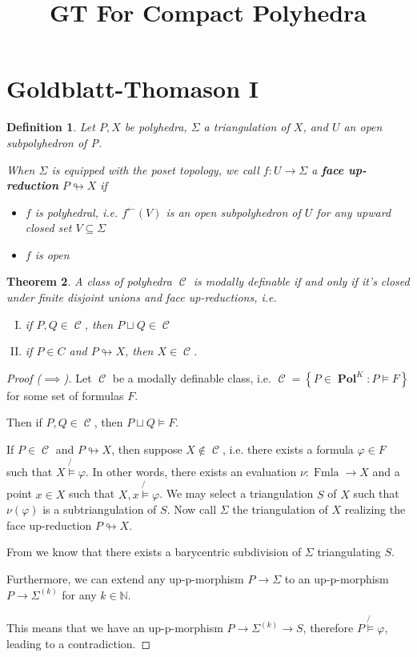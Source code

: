 \documentclass[12pt]{article}
\title{GT For Compact Polyhedra}
\DeclareMathOperator{\C}{\mathcal{C}}
\DeclareMathOperator{\Fmla}{Fmla}
\DeclareMathOperator{\Pol}{\textbf{Pol}}
\DeclareMathOperator{\upred}{\looparrowright}
\newcommand{\set}[1]{\left\{#1\right\}}
\newtheorem{theorem}{Theorem}
\newtheorem{definition}[theorem]{Definition}
\numberwithin{equation}{subsection}
\begin{document}
\maketitle
\section{Goldblatt-Thomason I}
\begin{definition}
	Let $P,X$ be polyhedra, $\Sigma$ a triangulation of $X$, and $U$ an open subpolyhedron of P.
	
	When $\Sigma$ is equipped with the poset topology, we call $f:U\to \Sigma$ a \textbf{face up-reduction} $P\upred X$ if 
	\begin{itemize}
		\item $f$ is polyhedral, i.e. $f^{\gets}(V)$ is an open subpolyhedron of $U$ for any upward closed set $V\subseteq \Sigma$
		\item $f$ is open
	\end{itemize}
\end{definition}
\begin{theorem}
A class of polyhedra $\C$ is modally definable if and only if it's closed under finite disjoint unions and face up-reductions, i.e. 
\begin{enumerate}[(I)]
	\item if $P,Q\in \C$, then $P\sqcup Q\in \C$
	\item if $P\in C$ and $P\upred X$, then $X\in \C$.
\end{enumerate}
\end{theorem}
\begin{proof}[Proof ($\implies$)]
Let $\C$ be a modally definable class, i.e. $\C=\set{P\in \Pol^K:P\models F}$ for some set of formulas $F$.

Then if $P,Q\in \C$, then $P\sqcup Q\models F$.

If $P\in \C$ and $P\upred X$, then suppose $X\notin \C$, i.e. there exists a formula $\varphi\in F$ such that $X\not{\models}\varphi$. In other words, there exists an evaluation $\nu:\Fmla\to X$ and a point $x\in X$ such that $X,x\not{\models}\varphi$. 
We may select a triangulation $S$ of $X$ such that $\nu(\varphi)$ is a subtriangulation of $S$.
	Now call $\Sigma$ the triangulation of $X$ realizing the face up-reduction $P\upred X$.
	
	From \cite{Dekker} we know that there exists a barycentric subdivision of $\Sigma$ triangulating $S$. 
	
	Furthermore, we can extend any up-p-morphism $P\to \Sigma$ to an up-p-morphism $P\to\Sigma^{(k)}$ for any $k\in \mathbb{N}$.
	
	This means that we have an up-p-morphism $P\to \Sigma^{(k)}\to S$, therefore $P\not{\models}\varphi$, leading to a contradiction.
\end{proof}
\end{document}
